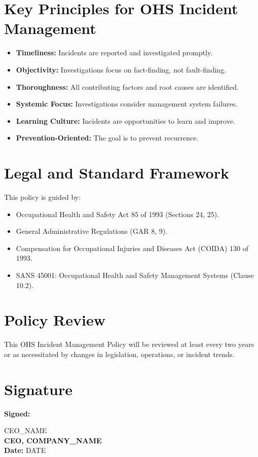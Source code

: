 \documentclass[12pt]{article}
\begin{document}
\section{Key Principles for OHS Incident Management}
\begin{itemize}
    \item \textbf{Timeliness:} Incidents are reported and investigated promptly.
    \item \textbf{Objectivity:} Investigations focus on fact-finding, not fault-finding.
    \item \textbf{Thoroughness:} All contributing factors and root causes are identified.
    \item \textbf{Systemic Focus:} Investigations consider management system failures.
    \item \textbf{Learning Culture:} Incidents are opportunities to learn and improve.
    \item \textbf{Prevention-Oriented:} The goal is to prevent recurrence.
\end{itemize}

\section{Legal and Standard Framework}
This policy is guided by:
\begin{itemize}
    \item Occupational Health and Safety Act 85 of 1993 (Sections 24, 25).
    \item General Administrative Regulations (GAR 8, 9).
    \item Compensation for Occupational Injuries and Diseases Act (COIDA) 130 of 1993.
    \item SANS 45001: Occupational Health and Safety Management Systems (Clause 10.2).
\end{itemize}

\section{Policy Review}
This OHS Incident Management Policy will be reviewed at least every two years or as necessitated by changes in legislation, operations, or incident trends.

\section{Signature}
\textbf{Signed:}

{{CEO_NAME}}\\
\textbf{CEO, {{COMPANY_NAME}}}\\
\textbf{Date:} {{DATE}}
\end{document}
